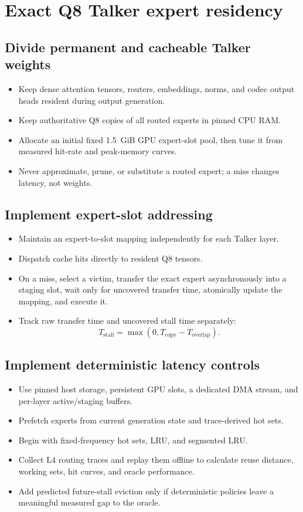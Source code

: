 \documentclass[10pt,letterpaper]{article}
\begin{document}
\section{Exact Q8 Talker expert residency}

\subsection{Divide permanent and cacheable Talker weights}
\begin{itemize}
    \item Keep dense attention tensors, routers, embeddings, norms, and codec output heads resident during output generation.
    \item Keep authoritative Q8 copies of all routed experts in pinned CPU RAM.
    \item Allocate an initial fixed 1.5~GiB GPU expert-slot pool, then tune it from measured hit-rate and peak-memory curves.
    \item Never approximate, prune, or substitute a routed expert; a miss changes latency, not weights.
\end{itemize}

\subsection{Implement expert-slot addressing}
\begin{itemize}
    \item Maintain an expert-to-slot mapping independently for each Talker layer.
    \item Dispatch cache hits directly to resident Q8 tensors.
    \item On a miss, select a victim, transfer the exact expert asynchronously into a staging slot, wait only for uncovered transfer time, atomically update the mapping, and execute it.
    \item Track raw transfer time and uncovered stall time separately:
    \[
    T_{\mathrm{stall}}=\max\left(0,T_{\mathrm{copy}}-T_{\mathrm{overlap}}\right).
    \]
\end{itemize}

\subsection{Implement deterministic latency controls}
\begin{itemize}
    \item Use pinned host storage, persistent GPU slots, a dedicated DMA stream, and per-layer active/staging buffers.
    \item Prefetch experts from current generation state and trace-derived hot sets.
    \item Begin with fixed-frequency hot sets, LRU, and segmented LRU.
    \item Collect L4 routing traces and replay them offline to calculate reuse distance, working sets, hit curves, and oracle performance.
    \item Add predicted future-stall eviction only if deterministic policies leave a meaningful measured gap to the oracle.
\end{itemize}
\end{document}
